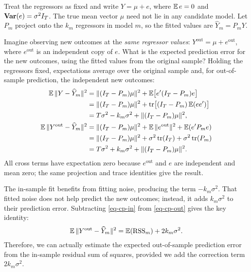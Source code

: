 \documentclass[a4paper,12pt]{article}
\begin{document}
Treat the regressors as fixed and write $Y=\mu+e$, where $\operatorname{\mathbb{E}} e=0$
and $\operatorname{\text{\textrm{\upshape\textbf{Var}}}}(e)=\sigma^2 I_T$.
The true mean vector $\mu$ need not lie in any candidate model.
Let $P_m$ project onto the $k_m$ regressors in model $m$,
so the fitted values are $\widehat Y_m=P_mY$.

Imagine observing new outcomes at the \emph{same regressor values}:
$Y^{\mathrm{out}}=\mu+e^{\mathrm{out}}$,
where $e^{\mathrm{out}}$ is an independent copy of $e$.
What is the expected prediction error for the new outcomes, using the fitted values from the original sample?
Holding the regressors fixed, expectations average over the original sample
and, for out-of-sample prediction, the independent new outcomes:
\begin{align}
    \operatorname{\mathbb{E}}\|Y-\widehat Y_m\|^2
    &=\|(I_T-P_m)\mu\|^2+\operatorname{\mathbb{E}}\bigl[e^{\prime}(I_T-P_m)e\bigr]\notag\\
    &=\|(I_T-P_m)\mu\|^2+\operatorname{tr}\bigl[(I_T-P_m)\operatorname{\mathbb{E}}(ee^{\prime})\bigr]\notag\\
    &=T\sigma^2-k_m\sigma^2+\|(I_T-P_m)\mu\|^2,\label{eq-cp-in}\\
    \operatorname{\mathbb{E}}\|Y^{\mathrm{out}}-\widehat Y_m\|^2
    &=\|(I_T-P_m)\mu\|^2+\operatorname{\mathbb{E}}\|e^{\mathrm{out}}\|^2+\operatorname{\mathbb{E}}(e^{\prime} P_m e)\notag\\
    &=\|(I_T-P_m)\mu\|^2+\sigma^2\operatorname{tr}(I_T)+\sigma^2\operatorname{tr}(P_m)\notag\\
    &=T\sigma^2+k_m\sigma^2+\|(I_T-P_m)\mu\|^2.\label{eq-cp-out}
\end{align}
All cross terms have expectation zero because $e^{\mathrm{out}}$ and $e$ are independent and mean zero;
the same projection and trace identities give the result.

The in-sample fit benefits from fitting noise, producing the term $-k_m\sigma^2$.
That fitted noise does not help predict the new outcomes; instead, it adds $k_m\sigma^2$ to their prediction error.
Subtracting \eqref{eq-cp-in} from \eqref{eq-cp-out} gives the key identity:
\begin{align}\label{eq-cp-correction}
    \operatorname{\mathbb{E}}\|Y^{\mathrm{out}}-\widehat Y_m\|^2
    =\operatorname{\mathbb{E}}(\mathrm{RSS}_m)+2k_m\sigma^2.
\end{align}
Therefore, we can actually estimate the expected out-of-sample prediction error from the in-sample residual sum of squares,
provided we add the correction term $2k_m\sigma^2$.
\end{document}

